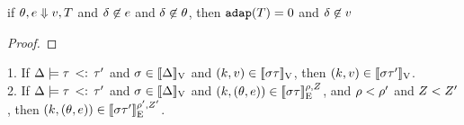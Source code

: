 \clearpage

\begin{lem} \label{lem:delta_free}
  if $\theta, e
    \mathrel{\Downarrow} v,  T $ and $\delta \not \in e$ and $\delta \not
    \in \theta$, then $ \mathtt{adap}(T)   = 0 $ and $\delta \not \in v $
\end{lem}
\begin{proof}
\end{proof}

\begin{lem}\label{lem:sub_sound}
1. If $ \Delta \models  \tau  \, <: \,  \tau'  $ and $ \sigma \in [\![ \Delta ]\!]_{\text{V}}$ and  $(k, v) \in [\![ \sigma \tau ]\!]_{\text{V}}$,  then  $(k, v) \in [\![ \sigma \tau' ]\!]_{\text{V}}$.
  \\
 2. If $ \Delta \models  \tau  \, <: \,  \tau'  $ and $ \sigma \in
 [\![ \Delta ]\!]_{\text{V}}$ and  $(k, (\theta, e)) \in
 [\![ \sigma \tau ]\!]_{\text{E}}^{\rho, Z}$, and $\rho < \rho'$ and $Z < Z' $,  then  $(k, (\theta, e)) \in [\![ \sigma \tau' ]\!]_{\text{E}}^{\rho', Z'}$.
   \\
\end{lem}
%
